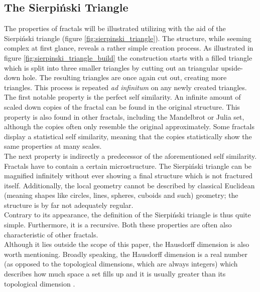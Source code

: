 \documentclass[12pt,a4paper,titlepage]{article}
\begin{document}
	\subsection{The Sierpiński Triangle}
	The properties of fractals will be illustrated utilizing with the aid of the Sierpiński triangle (figure \ref{fig:sierpinski_triangle}). The structure, while seeming complex at first glance, reveals a rather simple creation process. As illustrated in figure \ref{fig:sierpinski_triangle_build} the construction starts with a filled triangle which is split into three smaller triangles by cutting out an triangular upside-down hole. The resulting triangles are once again cut out, creating more triangles. This process is repeated \emph{ad infinitum} on any newly created triangles. \\
	The first notable property is the perfect self similarity. An infinite amount of scaled down copies of the fractal can be found in the original structure. This property is also found in other fractals, including the Mandelbrot or Julia set, although the copies often only resemble the original approximately. Some fractals display a statistical self similarity, meaning that the copies statistically show the same properties at many scales.\\
	The next property is indirectly a predecessor of the aforementioned self similarity. Fractals have to contain a certain microstructure. The Sierpiński triangle can be magnified infinitely without ever showing a final structure which is not fractured itself. Additionally, the local geometry cannot be described by classical Euclidean (meaning shapes like circles, lines, spheres, cuboids and such) geometry; the structure is by far not adequately regular.\\
	Contrary to its appearance, the definition of the Sierpiński triangle is thus quite simple. Furthermore, it is a recursive. Both these properties are often also characteristic of other fractals.\\
	Although it lies outside the scope of this paper, the Hausdorff dimension is also worth mentioning. Broadly speaking, the Hausdorff dimension is a real number (as opposed to the topological dimensions, which are always integers) which describes how much space a set fills up and it is usually greater than its topological dimension \cite[Einleitung]{FalconerKennethJ1993FG:m}.
	
\end{document}
